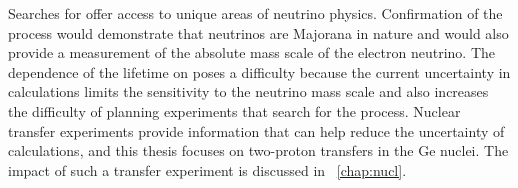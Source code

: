 Searches for \zvbb offer access to unique areas of neutrino physics.  Confirmation of the process would demonstrate that neutrinos are Majorana in nature and would also provide a measurement of the absolute mass scale of the electron neutrino.  The dependence of the lifetime on \NME poses a difficulty because the current uncertainty in calculations limits the sensitivity to the neutrino mass scale and also increases the difficulty of planning experiments that search for the process.  Nuclear transfer experiments provide information that can help reduce the uncertainty of \NME calculations, and this thesis focuses on two-proton transfers in the Ge nuclei.  The impact of such a transfer experiment is discussed in {\chap}~\ref{chap:nucl}.


%
% 
% 
